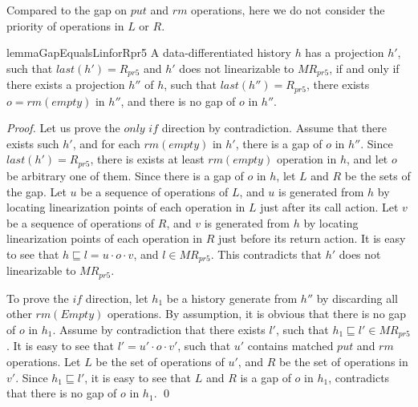 \documentclass{llncs}
\begin{document}
Compared to the gap on $\textit{put}$ and $\textit{rm}$ operations, here we do not consider the priority of operations in $L$ or $R$.



\begin{restatable}{lemma}{GapEqualsLinforRpr5}
\label{lemma:Gap Equals Lin for Rpr5}
A data-differentiated history $h$ has a projection $h'$, such that $\textit{last}(h') = R_{\textit{pr5}}$ and $h'$ does not linearizable to $\textit{MR}_{\textit{pr5}}$, if and only if there exists a projection $h''$ of $h$, such that $\textit{last}(h'') = R_{\textit{pr5}}$, there exists $o = \textit{rm}(\textit{empty})$ in $h''$, and there is no gap of $o$ in $h''$.
\end{restatable}

\begin {proof}

Let us prove the $\textit{only if}$ direction by contradiction. Assume that there exists such $h'$, and for each $\textit{rm}(\textit{empty})$ in $h'$, there is a gap of $o$ in $h''$. Since $\textit{last}(h') = R_{\textit{pr5}}$, there is exists at least $\textit{rm}(\textit{empty})$ operation in $h$, and let $o$ be arbitrary one of them. Since there is a gap of $o$ in $h$, let $L$ and $R$ be the sets of the gap. Let $u$ be a sequence of operations of $L$, and $u$ is generated from $h$ by locating linearization points of each operation in $L$ just after its call action. Let $v$ be a sequence of operations of $R$, and $v$ is generated from $h$ by locating linearization points of each operation in $R$ just before its return action. It is easy to see that $h \sqsubseteq l = u \cdot o \cdot v$, and $l \in \textit{MR}_{\textit{pr5}}$. This contradicts that $h'$ does not linearizable to $\textit{MR}_{\textit{pr5}}$.

To prove the $\textit{if}$ direction, let $h_1$ be a history generate from $h''$ by discarding all other $\textit{rm}(\textit{Empty})$ operations. By assumption, it is obvious that there is no gap of $o$ in $h_1$. Assume by contradiction that there exists $l'$, such that $h_1 \sqsubseteq l' \in \textit{MR}_{\textit{pr5}}$. It is easy to see that $l' = u' \cdot o \cdot v'$, such that $u'$ contains matched $\textit{put}$ and $\textit{rm}$ operations. Let $L$ be the set of operations of $u'$, and $R$ be the set of operations in $v'$. Since $h_1 \sqsubseteq l'$, it is easy to see that $L$ and $R$ is a gap of $o$ in $h_1$, contradicts that there is no gap of $o$ in $h_1$. \qed
\end {proof}
\end{document}
